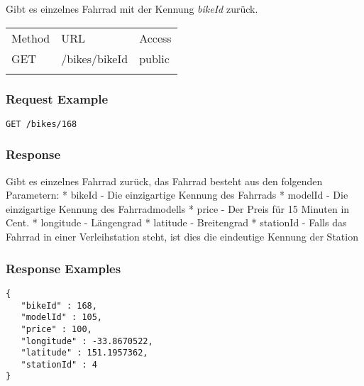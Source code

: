Gibt es einzelnes Fahrrad mit der Kennung \emph{bikeId} zurück.

\begin{longtable}[c]{@{}lll@{}}
\toprule\addlinespace
Method & URL & Access
\\\addlinespace
\midrule\endhead
GET & /bikes/bikeId & public
\\\addlinespace
\bottomrule
\end{longtable}

\subsubsection{Request Example}\label{request-example}

\begin{verbatim}
GET /bikes/168
\end{verbatim}

\subsubsection{Response}\label{response}

Gibt es einzelnes Fahrrad zurück, das Fahrrad besteht aus den folgenden
Parametern: * bikeId - Die einzigartige Kennung des Fahrrads * modelId -
Die einzigartige Kennung des Fahrradmodells * price - Der Preis für 15
Minuten in Cent. * longitude - Längengrad * latitude - Breitengrad *
stationId - Falls das Fahrrad in einer Verleihstation steht, ist dies
die eindeutige Kennung der Station

\subsubsection{Response Examples}\label{response-examples}

\begin{verbatim}
{
   "bikeId" : 168,
   "modelId" : 105,
   "price" : 100,
   "longitude" : -33.8670522,
   "latitude" : 151.1957362,
   "stationId" : 4 
}
\end{verbatim}
